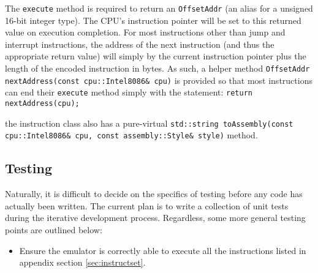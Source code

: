     The \texttt{execute} method is required to return an \texttt{OffsetAddr} (an alias for a unsigned 16-bit integer type). The CPU's instruction pointer will be set to this returned value on execution completion. For most instructions other than jump and interrupt instructions, the address of the next instruction (and thus the appropriate return value) will simply by the current instruction pointer plus the length of the encoded instruction in bytes. As such, a helper method \texttt{OffsetAddr nextAddress(const cpu::Intel8086\& cpu)} is provided so that most instructions can end their \texttt{execute} method simply with the statement: \texttt{return nextAddress(cpu);}

    the instruction class also has a pure-virtual \texttt{std::string toAssembly(const cpu::Intel8086\& cpu, const assembly::Style\& style)} method.

\subsection{Testing}
    Naturally, it is difficult to decide on the specifics of testing before any code has actually been written. The current plan is to write a collection of unit tests during the iterative development process. Regardless, some more general testing points are outlined below:

    \begin{itemize}
        \item Ensure the emulator is correctly able to execute all the instructions listed in appendix section \ref{sec:instructset}.
    \end{itemize}
